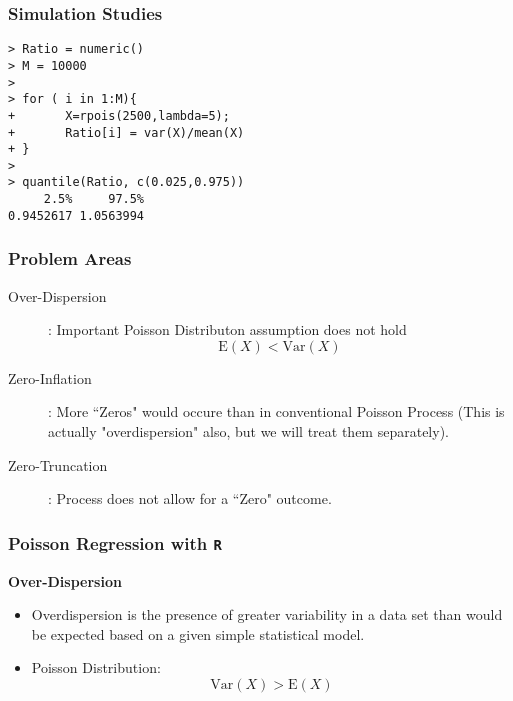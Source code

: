 \documentclass[MASTER.tex]{subfiles}
\begin{document}
\begin{frame}[fragile]
\frametitle{Simulation Studies}
\large
	\begin{framed}
		\begin{verbatim}
> Ratio = numeric()
> M = 10000
> 
> for ( i in 1:M){
+       X=rpois(2500,lambda=5);
+       Ratio[i] = var(X)/mean(X)
+ }
> 
> quantile(Ratio, c(0.025,0.975))
     2.5%     97.5% 
0.9452617 1.0563994 

		\end{verbatim}
	\end{framed}
\end{frame}



\begin{frame}
\frametitle{Problem Areas}
\Large
\begin{description}
\item[Over-Dispersion] : Important Poisson Distributon assumption does not hold 
\[ \mathrm{E}(X)  < \mathrm{Var}(X) \]
\item[Zero-Inflation] : More ``Zeros" would occure than in conventional Poisson Process (This is actually "overdispersion" also, but we will treat them separately). \smallskip
\item[ Zero-Truncation] : Process does not allow for a ``Zero" outcome. 
\end{description}
\end{frame}

\begin{frame}[fragile]
	
	\frametitle{Poisson Regression with \texttt{R}}
	\Large
	\textbf{Over-Dispersion}\\ 
	\begin{itemize}
		\item Overdispersion is the presence of greater variability
		in a data set than would be expected based on a given simple statistical model.
		\item Poisson Distribution:
		\[ \mathrm{Var}(X) >  \mathrm{E}(X) \]
	\end{itemize}
\end{frame}
\end{document}

